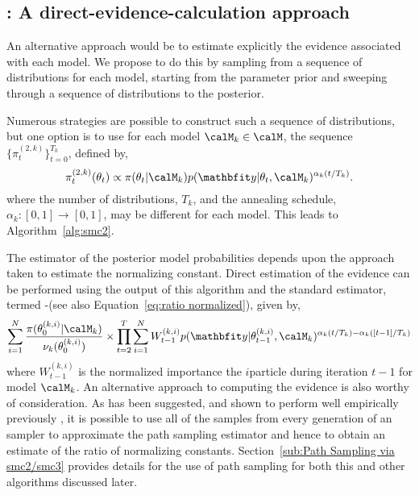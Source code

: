 \subsection[SMC2: A direct-evidence-calculation approach]{\smc[2]: A direct-evidence-calculation approach}
\label{sub:smc2: A direct-evidence-calculation approach}

An alternative approach would be to estimate explicitly the evidence associated with each model. We propose to do this by sampling from a sequence of distributions for each model, starting from the parameter prior and sweeping through a sequence of distributions to the posterior.

Numerous strategies are possible to construct such a sequence of distributions, but one option is to use for each model $\calM_k\in\calM$, the sequence $\{\pi_t^{(2,k)}\}_{t=0}^{T_k}$, defined by,
\begin{equation}
  \pi_t^{(2,k)}(\theta_t) \propto
  \pi(\theta_t|\calM_k)p(\data|\theta_t,\calM_k)^{\alpha_k(t/T_k)}.
  \label{eq:geometry_2}
\end{equation}
where the number of distributions, $T_k$, and the annealing schedule, $\alpha_k:[0,1]\to[0,1]$, may be different for each model. This leads to Algorithm~\ref{alg:smc2}.



The estimator of the posterior model probabilities depends upon the approach taken to estimate the normalizing constant. Direct estimation of the evidence can be performed using the output of this \smc algorithm and the standard estimator, termed \smc[2]-\ds (see also Equation~\eqref{eq:ratio normalized}), given by,
\begin{equation}
  \sum_{i=1}^N \frac{\pi(\theta_0^{(k,i)}|\calM_k)}{\nu_k(\theta_0^{(k,i)})}
  \times \prod_{t=2}^T \sum_{i=1}^N W_{t-1}^{(k,i)}
  p(\data|\theta_{t-1}^{(k,i)},\calM_k)^{\alpha_k(t/T_k) - \alpha_k([t-1]/T_k)}
  \label{eq:smc2-ds}
\end{equation}
where $W_{t-1}^{(k,i)}$ is the normalized importance  the $i$\xth particle during iteration $t-1$ for model $\calM_k$. An alternative approach to computing the evidence is also worthy of consideration. As has been suggested, and shown to perform well empirically previously \cite{Johansen:2006wm}, it is possible to use all of the samples from every generation of an \smc sampler to approximate the path sampling estimator and hence to obtain an estimate of the ratio of normalizing constants. Section~\ref{sub:Path Sampling via smc2/smc3} provides details for the use of path sampling for both this and other \smc algorithms discussed later.

